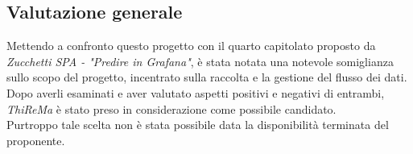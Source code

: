 \subsection{Valutazione generale}
Mettendo a confronto questo progetto con il quarto capitolato proposto da \textit{Zucchetti SPA - "Predire in Grafana"}, è stata notata una notevole somiglianza sullo scopo del progetto, incentrato sulla raccolta e la gestione del flusso dei dati.  \\
Dopo averli esaminati e aver valutato aspetti positivi e negativi di entrambi, \textit{ThiReMa} è stato preso in considerazione come possibile candidato. \\
Purtroppo tale scelta non è stata possibile data la disponibilità terminata del proponente.







